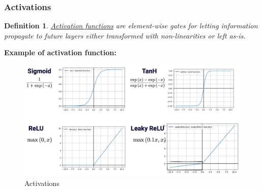 \documentclass[11pt,a4paper]{article}
\newtheorem{definition}{Definition}
\begin{document}
\subsubsection{Activations}
\begin{definition}
    \underline{Activation functions} are element-wise gates for letting information propagate to future layers either transformed with non-linearities or left as-is.
\end{definition}
\textbf{Example of activation function:}
\begin{center}\begin{figure}[htbp]
    \centering
    \includegraphics[scale=0.2]{activations.png}
    \caption{Activations}
    \label{}
\end{figure}\end{center}
\end{document}
